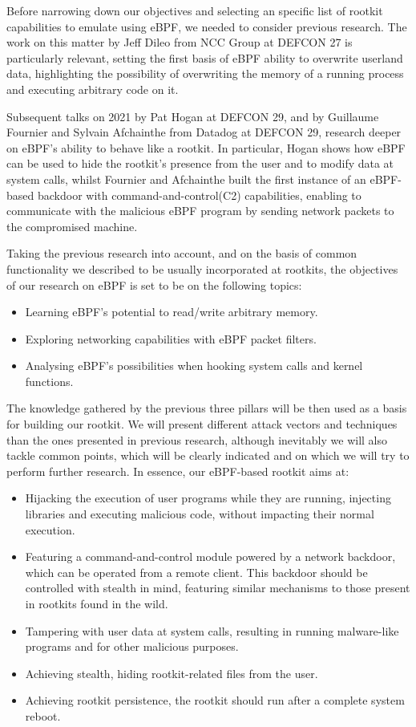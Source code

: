 \documentclass[12pt]{report} %
\begin{document}
Before narrowing down our objectives and selecting an specific list of rootkit capabilities to emulate using eBPF, we needed to consider previous research. The work on this matter by Jeff Dileo from NCC Group at DEFCON 27\cite{evil_ebpf} is particularly relevant, setting the first basis of eBPF ability to overwrite userland data, highlighting the possibility of overwriting the memory of a running process and executing arbitrary code on it.

Subsequent talks on 2021 by Pat Hogan at DEFCON 29\cite{bad_ebpf}, and by Guillaume Fournier and Sylvain Afchainthe from Datadog at DEFCON 29\cite{ebpf_friends}, research deeper on eBPF's ability to behave like a rootkit. In particular, Hogan shows how eBPF can be used to hide the rootkit's presence from the user and to modify data at system calls, whilst Fournier and Afchainthe built the first instance of an eBPF-based backdoor with command-and-control(C2) capabilities, enabling to communicate with the malicious eBPF program by sending network packets to the compromised machine.

Taking the previous research into account, and on the basis of common functionality we described to be usually incorporated at rootkits, the objectives of our research on eBPF is set to be on the following topics:
\begin{itemize}
\item Learning eBPF's potential to read/write arbitrary memory.
\item Exploring networking capabilities with eBPF packet filters.
\item Analysing eBPF's possibilities when hooking system calls and kernel functions.
\end{itemize}

The knowledge gathered by the previous three pillars will be then used as a basis for building our rootkit. We will present different attack vectors and techniques than the ones presented in previous research, although inevitably we will also tackle common points, which will be clearly indicated and on which we will try to perform further research. In essence, our eBPF-based rootkit aims at:
\begin{itemize}
\item Hijacking the execution of user programs while they are running, injecting libraries and executing malicious code, without impacting their normal execution.
\item Featuring a command-and-control module powered by a network backdoor, which can be operated from a remote client. This backdoor should be controlled with stealth in mind, featuring similar mechanisms to those present in rootkits found in the wild.
\item Tampering with user data at system calls, resulting in running malware-like programs and for other malicious purposes.
\item Achieving stealth, hiding rootkit-related files from the user.
\item Achieving rootkit persistence, the rootkit should run after a complete system reboot.
\
\end{itemize}
\end{document}
